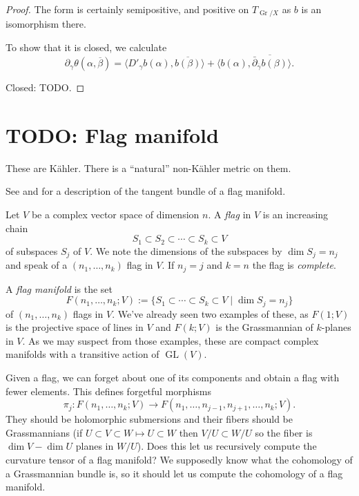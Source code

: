 \documentclass[10pt,a4paper]{article}
\newtheorem*{proof}{Proof}
\def\ov#1{\overline{#1}}
\DeclareMathOperator{\Gr}{Gr}
\DeclareMathOperator{\GL}{GL}
\begin{document}
\begin{proof}
The form is certainly semipositive, and positive on $T_{\Gr/X}$ as $b$ is an isomorphism there.

To show that it is closed, we calculate
\[
\partial_\gamma \theta(\alpha,\ov\beta)
= \langle D'_\gamma b(\alpha), \ov{b(\beta)} \rangle
+ \langle b(\alpha), \ov{\bar\partial_{\ov\gamma} b(\beta)} \rangle.
\]

Closed: TODO.
\end{proof}


\section{TODO: Flag manifold}
\label{sec:orga0ef6a0}

These are K\"ahler. There is a ``natural'' non-K\"ahler metric on them.

See \cite{lam1975formula} and \cite{papantonopoulou1983tangent} for a description of the tangent bundle of a flag manifold.

Let $V$ be a complex vector space of dimension $n$. A \emph{flag} in $V$ is an increasing chain
\[
S_1 \subset S_2 \subset \cdots \subset S_k \subset V
\]
of subspaces $S_j$ of $V$. We note the dimensions of the subspaces by
$\dim S_j = n_j$ and speak of a $(n_1, \ldots, n_k)$ flag in $V$. If
$n_j = j$ and $k = n$ the flag is \emph{complete}.

A \emph{flag manifold}  is the set
\[
F(n_1,\ldots,n_k; V)
:= \{
S_1 \subset \cdots \subset S_k \subset V
\mid
\text{$\dim S_j = n_j$}
\}
\]
of $(n_1,\ldots,n_k)$ flags in $V$. We've already seen two examples of
these, as $F(1;V)$ is the projective space of lines in $V$ and
$F(k;V)$ is the Grassmannian of $k$-planes in $V$. As we may suspect
from those examples, these are compact complex manifolds with a
transitive action of $\GL(V)$.

Given a flag, we can forget about one of its components and obtain a flag with fewer elements. This defines forgetful morphisms
\[
\pi_j : F(n_1,\ldots,n_k; V)
\to
F(n_1, \ldots, n_{j-1}, n_{j+1}, \ldots, n_k; V).
\]
They should be holomorphic submersions and their fibers should be Grassmannians
(if $U \subset V \subset W \mapsto U \subset W$ then $V/U \subset W/U$ so the fiber is
$\dim V-\dim U$ planes in $W/U$). Does this let us recursively compute
the curvature tensor of a flag manifold? We supposedly know what the
cohomology of a Grassmannian bundle is, so it should let us compute the
cohomology of a flag manifold.
\end{document}
